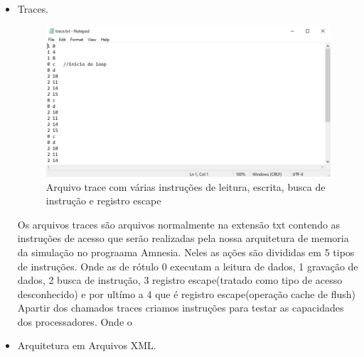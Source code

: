 \documentclass[conference]{IEEEtran}
\begin{document}
\begin{itemize}
\item Traces. \\
\begin{figure}[H]
  \includegraphics[width=\linewidth]{trace.jpg}
  \caption{Arquivo trace com várias instruções de leitura, escrita, busca de instrução e registro escape}
  \label{fig:trace}
\end{figure}
Os arquivos traces são  arquivos normalmente na extensão txt contendo as instruções de acesso que serão realizadas pela nossa arquitetura de memoria da simulação no prograama Amnesia. Neles as ações são divididas em 5 tipos de instruções. Onde as de rótulo 0 executam a leitura de dados, 1 gravação de dados, 2 busca de instrução, 3 registro escape(tratado como tipo de acesso desconhecido) e por ultímo a 4 que é registro escape(operação cache de flush)
Apartir dos chamados traces criamos instruções para testar as capacidades dos processadores. Onde o 
\
\\
\item Arquitetura em Arquivos XML. \\


\end{itemize}
\end{document}
